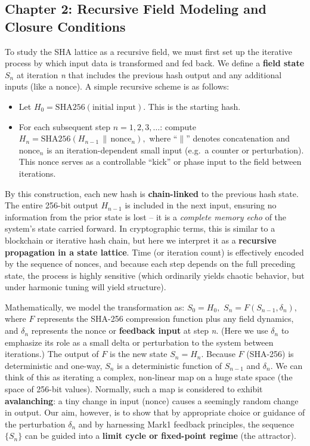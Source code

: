\documentclass[11pt]{article}
\providecommand{\tightlist}{%
      \setlength{\itemsep}{0pt}\setlength{\parskip}{0pt}}
\begin{document}
\hypertarget{chapter-2-recursive-field-modeling-and-closure-conditions}{%
\subsection{Chapter 2: Recursive Field Modeling and Closure
Conditions}\label{chapter-2-recursive-field-modeling-and-closure-conditions}}

To study the SHA lattice as a recursive field, we must first set up the
iterative process by which input data is transformed and fed back. We
define a \textbf{field state} \(S_n\) at iteration \emph{n} that
includes the previous hash output and any additional inputs (like a
nonce). A simple recursive scheme is as follows:

\begin{itemize}
\tightlist
\item
  Let \(H_0 = \text{SHA256}(\text{initial input})\). This is the
  starting hash.
\item
  For each subsequent step \(n = 1,2,3,\dots\): compute
  \(H_n = \text{SHA256}(H_{n-1} \,\|\, \text{nonce}_n),\) where
  ``\(\|\)'' denotes concatenation and \(\text{nonce}_n\) is an
  iteration-dependent small input (e.g.~a counter or perturbation). This
  nonce serves as a controllable ``kick'' or phase input to the field
  between iterations.
\end{itemize}

By this construction, each new hash is \textbf{chain-linked} to the
previous hash state. The entire 256-bit output \(H_{n-1}\) is included
in the next input, ensuring no information from the prior state is lost
-- it is a \emph{complete memory echo} of the system's state carried
forward. In cryptographic terms, this is similar to a blockchain or
iterative hash chain, but here we interpret it as a \textbf{recursive
propagation in a state lattice}. Time (or iteration count) is
effectively encoded by the sequence of nonces, and because each step
depends on the full preceding state, the process is highly sensitive
(which ordinarily yields chaotic behavior, but under harmonic tuning
will yield structure).

Mathematically, we model the transformation as: \(S_0 = H_0,\)
\(S_n = F(S_{n-1}, \delta_n),\) where \(F\) represents the SHA-256
compression function plus any field dynamics, and \(\delta_n\)
represents the nonce or \textbf{feedback input} at step \emph{n}. (Here
we use \(\delta_n\) to emphasize its role as a small delta or
perturbation to the system between iterations.) The output of \(F\) is
the new state \(S_n = H_n\). Because \(F\) (SHA-256) is deterministic
and one-way, \(S_n\) is a deterministic function of \(S_{n-1}\) and
\(\delta_n\). We can think of this as iterating a complex, non-linear
map on a huge state space (the space of 256-bit values). Normally, such
a map is considered to exhibit \textbf{avalanching}: a tiny change in
input (nonce) causes a seemingly random change in output. Our aim,
however, is to show that by appropriate choice or guidance of the
perturbation \(\delta_n\) and by harnessing Mark1 feedback principles,
the sequence \(\{S_n\}\) can be guided into a \textbf{limit cycle or
fixed-point regime} (the attractor).
\end{document}
